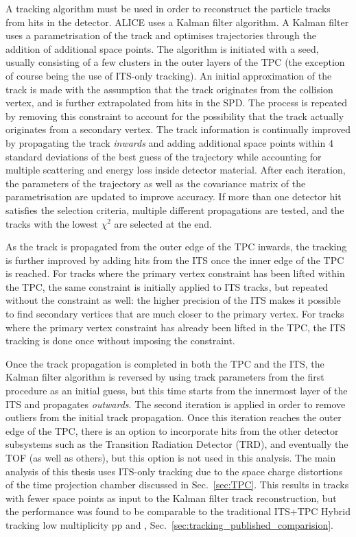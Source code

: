 A tracking algorithm must be used in order to reconstruct the particle tracks from hits in the detector. ALICE uses a Kalman filter algorithm. A Kalman filter uses a parametrisation of the track and optimises trajectories through the addition of additional space points. The algorithm is initiated with a seed, usually consisting of a few clusters in the outer layers of the TPC (the exception of course being the use of ITS-only tracking). An initial approximation of the track is made with the assumption that the track originates from the collision vertex, and is further extrapolated from hits in the SPD. The process is repeated by removing this constraint to account for the possibility that the track actually originates from a secondary vertex. The track information is continually improved by propagating the track \textit{inwards} and adding additional space points within 4 standard deviations of the best guess of the trajectory while accounting for multiple scattering and energy loss inside detector material. After each iteration, the parameters of the trajectory as well as the covariance matrix of the parametrisation are updated to improve accuracy. If more than one detector hit satisfies the selection criteria, multiple different propagations are tested, and the tracks with the lowest $\chi^2$ are selected at the end.

As the track is propagated from the outer edge of the TPC inwards, the tracking is further improved by adding hits from the ITS once the inner edge of the TPC is reached. For tracks where the primary vertex constraint has been lifted within the TPC, the same constraint is initially applied to ITS tracks, but repeated without the constraint as well: the higher precision of the ITS makes it possible to find secondary vertices that are much closer to the primary vertex. For tracks where the primary vertex constraint has already been lifted in the TPC, the ITS tracking is done once without imposing the constraint.

Once the track propagation is completed in both the TPC and the ITS, the Kalman filter algorithm is reversed by using track parameters from the first procedure as an initial guess, but this time starts from the innermost layer of the ITS and propagates \textit{outwards}. The second iteration is applied in order to remove outliers from the initial track propagation. Once this iteration reaches the outer edge of the TPC, there is an option to incorporate hits from the other detector subsystems such as the Transition Radiation Detector (TRD), and eventually the TOF (as well as others), but this option is not used in this analysis. The main analysis of this thesis uses ITS-only tracking due to the space charge distortions of the time projection chamber discussed in Sec.~\ref{sec:TPC}. This results in tracks with fewer space points as input to the Kalman filter track reconstruction, but the performance was found to be comparable to the traditional ITS+TPC Hybrid tracking low multiplicity pp and \pPb, Sec.~\ref{sec:tracking_published_comparision}.

